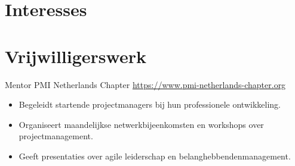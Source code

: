 \documentclass[a4paper, serif, 10pt]{moderncv}
\begin{document}
\section{Interesses}

\section{Vrijwilligerswerk}

        {Mentor}
        {PMI Netherlands Chapter}
        {\url{https://www.pmi-netherlands-chapter.org}}
        {}
        {\begin{itemize}
\item Begeleidt startende projectmanagers bij hun professionele ontwikkeling.
\item Organiseert maandelijkse netwerkbijeenkomsten en workshops over projectmanagement.
\item Geeft presentaties over agile leiderschap en belanghebbendenmanagement.
\end{itemize}}
    
\end{document}
